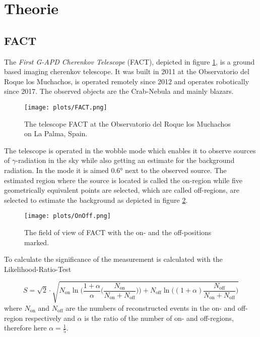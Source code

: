 \section{Theorie}
\label{sec:Theorie}

\subsection{FACT}

The \textit{First G-APD Cherenkov Telescope} (FACT), depicted in figure \ref{fig:FACT}, is a ground based imaging cherenkov telescope. It was built in 2011 at the Observatorio 
del Roque los Muchachos, is operated remotely since 2012 and operates robotically since 2017.
The observed objects are the Crab-Nebula and mainly blazars. 
%
\begin{figure}[H]
    \centering
    \texttt{[image: plots/FACT.png]}
    \caption{The telescope FACT at the Observatorio del Roque los Muchachos on La Palma, Spain. \cite{sample}}
    \label{fig:FACT}
  \end{figure}
The telescope is operated in the wobble mode which enables it to observe sources of $\gamma$-radiation in the sky while also getting an estimate for the 
background radiation. In the mode it is aimed $0.6 °$ next to the observed source. The estimated region where the source is located is called the on-region 
while five geometrically equivalent points are selected, which are called off-regions, are selected to estimate the background as depicted in figure 
\ref{fig:OnOff}. 

\begin{figure}[H]
    \centering
    \texttt{[image: plots/OnOff.png]}
    \caption{The field of view of FACT with the on- and the off-positions marked. \cite{sample}}
    \label{fig:OnOff}
\end{figure}

To calculate the significance of the measurement is calculated with the Likelihood-Ratio-Test 

\begin{equation}
    S = \sqrt{2} \cdot \sqrt{N_\text{on} \ln \biggl( \frac{1+ \alpha}{\alpha} \biggl( \frac{N_\text{on}}{N_\text{on} + N_\text{off}} \biggr) \biggr) 
    + N_\text{off} \ln \biggl( (1+\alpha) \frac{N_\text{off}}{N_\text{on} + N_\text{off} } \biggr) }
\end{equation}
where $N_\text{on}$ and $N_\text{off}$ are the numbers of reconstructed events in the on- and off-region respectively and $\alpha$ is the ratio of the number of 
on- and off-regions, therefore here $\alpha = \frac{1}{5}$.


